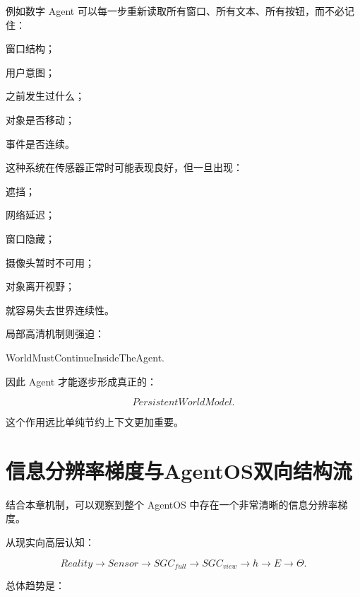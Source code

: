 例如数字 Agent 可以每一步重新读取所有窗口、所有文本、所有按钮，而不必记住：

窗口结构；

用户意图；

之前发生过什么；

对象是否移动；

事件是否连续。

这种系统在传感器正常时可能表现良好，但一旦出现：

遮挡；

网络延迟；

窗口隐藏；

摄像头暂时不可用；

对象离开视野；

就容易失去世界连续性。

局部高清机制则强迫：

\begin{statementbox}
WorldMustContinueInsideTheAgent.
\end{statementbox}

因此 Agent 才能逐步形成真正的：

\[
PersistentWorldModel.
\]

这个作用远比单纯节约上下文更加重要。

\section{信息分辨率梯度与AgentOS双向结构流}

结合本章机制，可以观察到整个 AgentOS 中存在一个非常清晰的信息分辨率梯度。

从现实向高层认知：

\[
Reality
\rightarrow
Sensor
\rightarrow
SGC_{full}
\rightarrow
SGC_{view}
\rightarrow
h
\rightarrow
E
\rightarrow
\Theta.
\]

总体趋势是：

\begin{statementbox}
\centering
{}
\end{statementbox}

\begin{statementbox}
\centering
{}
\end{statementbox}

\begin{statementbox}
\centering
{}
\end{statementbox}


